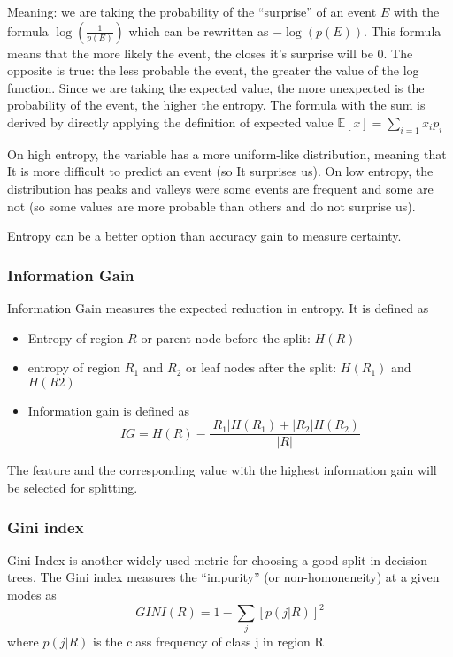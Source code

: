 \documentclass[11pt]{article}
\begin{document}
Meaning: we are taking the probability of the ``surprise'' of an event
\(E\) with the formula \(\log(\frac{1}{p(E)})\) which can be rewritten
as \(-\log(p(E))\). This formula means that the more likely the event,
the closes it's surprise will be 0. The opposite is true: the less
probable the event, the greater the value of the log function. Since we
are taking the expected value, the more unexpected is the probability of
the event, the higher the entropy. The formula with the sum is derived
by directly applying the definition of expected value
\(\mathbb{E}[x]=\sum_{i=1}x_i p_i\)

On high entropy, the variable has a more uniform-like distribution,
meaning that It is more difficult to predict an event (so It surprises
us). On low entropy, the distribution has peaks and valleys were some
events are frequent and some are not (so some values are more probable
than others and do not surprise us).

Entropy can be a better option than accuracy gain to measure certainty.

\subsubsection{Information Gain}\label{information-gain}

Information Gain measures the expected reduction in entropy. It is
defined as

\begin{itemize}
\tightlist
\item
  Entropy of region \(R\) or parent node before the split: \(H(R)\)
\item
  entropy of region \(R_1\) and \(R_2\) or leaf nodes after the split:
  \(H(R_1)\) and \(H(R2)\)
\item
  Information gain is defined as
  \[IG = H(R) - \frac{|R_1|H(R_1) + |R_2|H(R_2)}{|R|}\]
\end{itemize}

The feature and the corresponding value with the highest information
gain will be selected for splitting.

\subsubsection{Gini index}\label{gini-index}

Gini Index is another widely used metric for choosing a good split in
decision trees. The Gini index measures the ``impurity'' (or
non-homoneneity) at a given modes as \[GINI(R)=1-\sum_j [p(j|R)]^2\]
where \(p(j|R)\) is the class frequency of class j in region R
\end{document}
